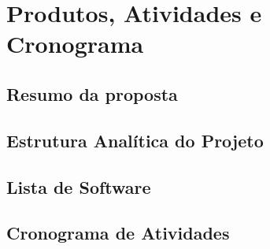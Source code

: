 \chapter[Produtos, Atividades e Cronograma]{Produtos, Atividades e Cronograma}

\section{Resumo da proposta}
\section{Estrutura Analítica do Projeto}
\section{Lista de Software}
\section{Cronograma de Atividades}
